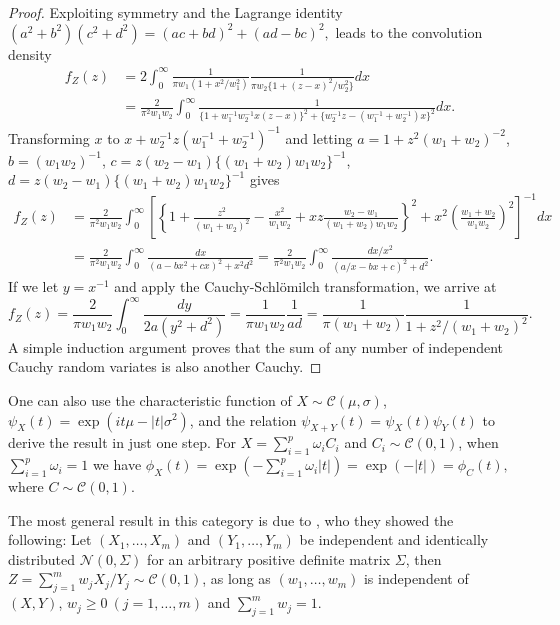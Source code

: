 \documentclass[ECP]{ejpecp} %
\def\CS{Cauchy-Schl\"omilch}
\newcommand{\NormRV}{\mathcal{N}}
\newcommand{\CauchyRV}{\mathcal{C}}
\begin{document}
\begin{proof}
Exploiting symmetry and the Lagrange identity $(a^2 + b^2)(c^2 + d^2) = (ac+bd)^2 + (ad-bc)^2,$ leads to the convolution density
\begin{align*} 
  f_Z(z) &= 2 \int_{0}^{\infty} 
  \frac{1}{ \pi w_1 (1+ x^2/w_1^2)} \frac{1}{\pi w_2 \{1+ (z-x)^2 / w_2^2 \} } dx
  \\
  & = \frac{2}{\pi^2 w_1 w_2} \int_{0}^{\infty} 
  \frac{1}{\{1+ w_1^{-1} w_2^{-1} x (z-x) \}^2 + \{w_2^{-1}z - (w_1^{-1}+ w_2^{-1}) x \}^2 } dx.
\end{align*}
Transforming $x$ to $x + w_2^{-1}z (w_1^{-1} + w_2^{-1})^{-1}$ and letting $a = 1 + z^2(w_1+w_2)^{-2}$, $b =(w_1 w_2)^{-1}$, $c = z (w_2-w_1) \{(w_1+w_2) w_1 w_2\}^{-1}$, $d = z (w_2-w_1)\{(w_1+w_2) w_1 w_2\}^{-1}$ gives
\begin{align*}
  f_Z(z) &= \frac{2}{\pi^2 w_1 w_2} \int_{0}^{\infty} 
  \left[ 
    \left\{ 1 + \frac{z^2}{(w_1+w_2)^2} - \frac{x^2}{w_1w_2} + 
      xz \frac{w_2-w_1}{(w_1+w_2) w_1 w_2} \right\}^2 + 
    x^2 \left(\frac{w_1 + w_2}{w_1w_2} \right)^2 
  \right]^{-1} dx 
  \\
  &= \frac{2}{\pi^2 w_1 w_2} \int_{0}^{\infty} 
  \frac{dx}{\left( a - b x^2 + cx \right)^2 + x^2 d^2} 
  = \frac{2}{\pi^2 w_1 w_2} \int_{0}^{\infty} 
  \frac{dx/x^2}{\left(a/x - bx + c \right)^2 + d^2 }.
\end{align*}
If we let $y = x^{-1}$ and apply the \CS{} transformation, we arrive at 
\[
  f_Z(z) = \frac{2}{\pi w_1 w_2} \int_{0}^{\infty} \frac{dy}{2a (y^2 + d^2)} 
  = \frac{1}{\pi w_1 w_2} \frac{1}{ad}= \frac{1}{\pi (w_1+w_2)} \frac{1}{1+ z^2/(w_1+w_2)^2}.
\]
A simple induction argument proves that the sum of any number of independent
Cauchy random variates is also another Cauchy.
\end{proof}

One can also use the characteristic function of $X \sim \CauchyRV(\mu, \sigma)$, $\psi_X(t) = \exp(it \mu - |t| \sigma^2)$, and the relation $\psi_{X+Y}(t) = \psi_X(t) \psi_Y(t)$ to derive the result in just one step. For $X = \sum_{i=1}^{p} \omega_i C_i$ and $C_i \sim \CauchyRV(0,1)$, when $\sum_{i=1}^{p} \omega_i = 1$ we have 
$\phi_X(t) = \exp\left(-\sum_{i=1}^{p}\omega_i |t|\right) = \exp(-|t|) = \phi_C(t),$ where $C \sim \CauchyRV(0, 1)$. 

The most general result in this category is due to \cite{pillai2015unexpected},
who they showed the following: 
Let $(X_1,\ldots,X_m)$ and $(Y_1, \ldots, Y_m)$ be independent and
identically distributed $\NormRV(0, \Sigma)$ for an arbitrary
positive definite matrix $\Sigma$, then 
$Z = \sum_{j=1}^{m} w_j X_j / Y_j \sim \CauchyRV(0, 1)$, 
as long as $(w_1, \ldots, w_m)$ is independent of $(X, Y)$,
$w_j \geq 0\ (j = 1, \ldots, m)$ and $\sum_{j=1}^{m} w_j = 1$. 
\end{document}
